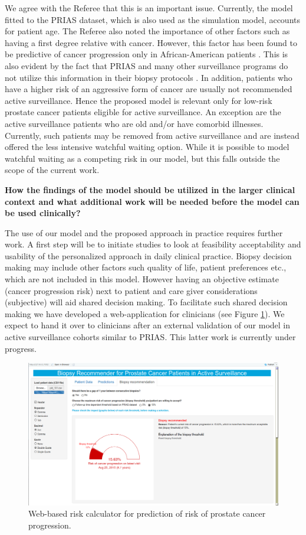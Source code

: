 \begin{enumerate}
    We agree with the Referee that this is an important issue. Currently, the model fitted to the PRIAS dataset, which is also used as the simulation model, accounts for patient age. The Referee also noted the importance of other factors such as having a first degree relative with cancer. However, this factor has been found to be predictive of cancer progression only in African-American patients \citep{telang2017prostate,goh2013clinical}. This is also evident by the fact that PRIAS and many other surveillance programs do not utilize this information in their biopsy protocols \citep{bokhorst2016decade,nieboer2018active}. In addition, patients who have a higher risk of an aggressive form of cancer are usually not recommended active surveillance. Hence the proposed model is relevant only for low-risk prostate cancer patients eligible for active surveillance. An exception are the active surveillance patients who are old and/or have comorbid illnesses. Currently, such patients may be removed from active surveillance and are instead offered the less intensive watchful waiting \citep{bokhorst2016decade} option. While it is possible to model watchful waiting as a competing risk in our model, but this falls outside the scope of the current work. 

    \textbf{How the findings of the model should be utilized in the larger clinical context and what additional work will be needed before the model can be used clinically?}
    
    The use of our model and the proposed approach in practice requires further work. A first step will be to initiate studies to look at feasibility acceptability and usability of the personalized approach in daily clinical practice. Biopsy decision making may include other factors such quality of life, patient preferences etc., which are not included in this model. However having an objective estimate (cancer progression risk) next to patient and care giver considerations (subjective) will aid shared decision making. To facilitate such shared decision making we have developed a web-application for clinicians (see Figure \ref{fig:webapp2}). We expect to hand it over to clinicians after an external validation of our model in active surveillance cohorts similar to PRIAS. This latter work is currently under progress.

    \begin{figure}[!htb]
	    		\centerline{\includegraphics[width=0.8\columnwidth]{../images/webapp.png}}
				\caption{Web-based risk calculator for prediction of risk of prostate cancer progression.}
				\label{fig:webapp2}
			\end{figure}
    
\end{enumerate}


